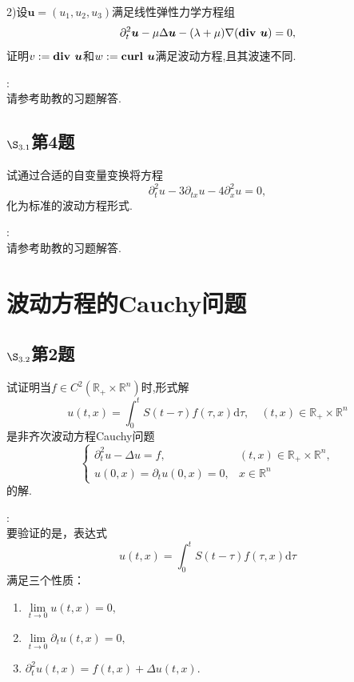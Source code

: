 \documentclass[12pt, a4paper]{ctexbook}
\newcommand{\curl}{\text{\bf curl }}
\renewcommand{\d}{\text{d}}
\begin{document}
    2)设$\bm u = (u_1, u_2, u_3)$满足线性弹性力学方程组
    $$\partial_t^2\bm u -\mu\Delta \bm u -(\lambda + \mu)\nabla(\text{\bf div }\bm u) = 0,$$
    证明$v := \text{\bf div }\bm u$和$w:=\curl \bm u$满足波动方程,且其波速不同.
    
    \songti{}:\\
    
    请参考助教的习题解答.
    
    
    \subsection{$\S_{3.1}$第4题}
    \kaishu{}
    
    试通过合适的自变量变换将方程
    $$\partial_t^2 u - 3\partial_{tx}u - 4\partial_x^2 u = 0,$$
    化为标准的波动方程形式.
    
    \songti{}:\\
    
    请参考助教的习题解答.
    
    \section{波动方程的Cauchy问题}
    
    
    \subsection{$\S_{3.2}$第2题}
    \kaishu{}
    
    试证明当$f\in C^2(\mathbb R_+ \times \mathbb R^n)$时,形式解
    $$u(t,x) = \int_0^t S(t-\tau) f(\tau , x)\d\tau, \quad (t,x)\in \mathbb R_+\times \mathbb R^n$$是非齐次波动方程Cauchy问题
    $$\begin{cases}
    \partial_t^2 u -\Delta u = f, & (t,x)\in \mathbb R_+\times \mathbb R^n,\\
    u(0, x) = \partial_t u(0, x) = 0, & x \in \mathbb R^n
    \end{cases}$$
    的解.
    
    \songti{}:\\
    
        要验证的是，表达式
    \begin{equation*}
    u(t,x) = \int_0^t S(t-\tau)f(\tau,x)\d\tau
    \end{equation*}
    满足三个性质：
    \begin{enumerate}
        \item $\lim\limits_{t\to 0} u(t,x) = 0,$
        \item $\lim\limits_{t\to 0} \partial_t u(t,x) = 0,$
        \item $\partial_t^2u(t,x) = f(t,x) + \Delta u(t,x).$
    \end{enumerate}
    
\end{document}
